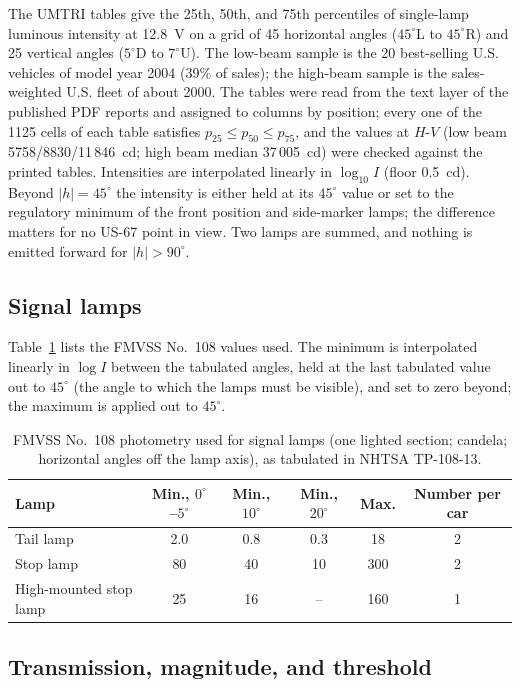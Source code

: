 \documentclass[11pt]{article}
\begin{document}
The UMTRI tables\cite{Schoettle2004,Schoettle2001} give the 25th, 50th, and 75th percentiles of single-lamp luminous intensity at 12.8~V on a grid of 45 horizontal angles ($45^\circ$L to $45^\circ$R) and 25 vertical angles ($5^\circ$D to $7^\circ$U). The low-beam sample is the 20 best-selling U.S. vehicles of model year 2004 (39\% of sales); the high-beam sample is the sales-weighted U.S. fleet of about 2000. The tables were read from the text layer of the published PDF reports and assigned to columns by position; every one of the 1125 cells of each table satisfies $p_{25}\le p_{50}\le p_{75}$, and the values at $H$-$V$ (low beam 5758/8830/11\,846~cd; high beam median 37\,005~cd) were checked against the printed tables. Intensities are interpolated linearly in $\log_{10}I$ (floor 0.5~cd). Beyond $|h|=45^\circ$ the intensity is either held at its $45^\circ$ value or set to the regulatory minimum of the front position and side-marker lamps; the difference matters for no US-67 point in view. Two lamps are summed, and nothing is emitted forward for $|h|>90^\circ$.

\subsection{Signal lamps}

Table~\ref{t:fmvss} lists the FMVSS No.~108 values used.\cite{TP108} The minimum is interpolated linearly in $\log I$ between the tabulated angles, held at the last tabulated value out to $45^\circ$ (the angle to which the lamps must be visible), and set to zero beyond; the maximum is applied out to $45^\circ$.

\begin{table}[htbp]
\caption{FMVSS No.~108 photometry used for signal lamps (one lighted section; candela; horizontal angles off the lamp axis), as tabulated in NHTSA TP-108-13.}
\label{t:fmvss}
\small
\begin{tabular}{lccccc}
\toprule
Lamp & Min., $0^\circ$--$5^\circ$ & Min., $10^\circ$ & Min., $20^\circ$ & Max. & Number per car\\
\midrule
Tail lamp & 2.0 & 0.8 & 0.3 & 18 & 2\\
Stop lamp & 80 & 40 & 10 & 300 & 2\\
High-mounted stop lamp & 25 & 16 & -- & 160 & 1\\
\bottomrule
\end{tabular}
\end{table}

\subsection{Transmission, magnitude, and threshold}
\end{document}
